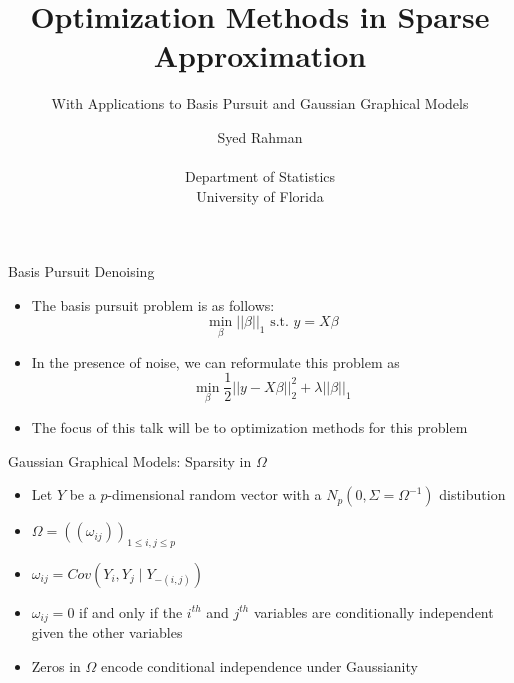 \documentclass[xcolor=dvipsnames,aspectratio=1610]{beamer}
\title{Optimization Methods in Sparse Approximation}
\subtitle{With Applications to Basis Pursuit and Gaussian Graphical Models}
\author{Syed Rahman\\\ \\
  \small Department of Statistics\\
  University of Florida}
\date{}
\newcommand\independent{\protect\mathpalette{\protect\independenT}{\perp}}
\def\independenT#1#2{\mathrel{\rlap{$#1#2$}\mkern2mu{#1#2}}}
\newcommand{\norm}[1]{\left|\left|#1\right|\right|}
\theoremstyle{remark}
\begin{document}
{ %
  \begin{frame}[noframenumbering]
  \vspace{1cm}
    \titlepage
  \end{frame}
}


\begin{frame}{Basis Pursuit Denoising}
  \begin{itemize}
    \setlength{\itemsep}{10pt}
  \item The basis pursuit problem is as follows:
$$
\min_\beta \norm{\beta}_1 \text{ s.t. } y = X \beta
$$
\item In the presence of noise, we can reformulate this problem as 
$$
\min_\beta \frac{1}{2}\norm{y - X \beta}_2^2 + \lambda \norm{\beta}_1  
$$
\item The focus of this talk will be to optimization methods for this problem
  \end{itemize}
\end{frame}

\begin{frame}{Gaussian Graphical Models: Sparsity in $\Omega$}
  \begin{itemize}
    \setlength{\itemsep}{16pt}
  \item Let $Y$ be a $p$-dimensional random vector with a $N_p ( 0, \Sigma = 
  \Omega^{-1})$ distibution 
  \item $\Omega = ((\omega_{ij}))_{1 \leq i,j \leq p}$ 
  \item $\omega_{ij} = Cov(Y_i, Y_j \mid {Y}_{-(i,j)})$ 
  \item $\omega_{ij} = 0$ if and only if the $i^{th}$ and 
  $j^{th}$ variables are conditionally independent given the other variables 
  \item Zeros in $\Omega$ encode conditional independence under Gaussianity 
  \end{itemize}
\end{frame}
\end{document}
